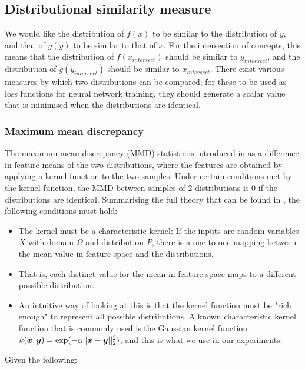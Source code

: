 \subsection{Distributional similarity measure}

We would like the distribution of $f(x)$ to be similar to the distribution of $y$, and that of $g(y)$ to be similar to that of $x$. For the intersection of concepts, this means that the distribution of $f(x_{intersect})$ should be similar to $y_{intersect}$, and the distribution of $g(y_{intersect})$ should be similar to $x_{intersect}$. There exist various measures by which two distributions can be compared; for these to be used as loss functions for neural network training, they should generate a scalar value that is minimised when the distributions are identical. 

\subsubsection{Maximum mean discrepancy}

The maximum mean discrepancy (MMD) statistic is introduced in \cite{MMDGretton} as a difference in feature means of the two distributions, where the features are obtained by applying a kernel function to the two samples. Under certain conditions met by the kernel function, the MMD between samples of 2 distributions is 0 if the distributions are identical. Summarising the full theory that can be found in \cite{MMDGretton}, the following conditions must hold:

\begin{itemize}
    \item The kernel must be a characteristic kernel: If the inputs are random variables $X$ with domain $\Omega$ and distribution $P$, there is a one to one mapping between the mean value in feature space and the distributions. \cite{KernelMeanEmbeddingReview} 
    \item That is, each distinct value for the mean in feature space maps to a different possible distribution. 
    \item An intuitive way of looking at this is that the kernel function must be "rich enough" to represent all possible distributions. A known characteristic kernel function that is commonly used is the Gaussian kernel function $k(\boldsymbol{x}, \boldsymbol{y}) = \exp(-\alpha ||\boldsymbol{x} - \boldsymbol{y}||_2^2)$, and this is what we use in our experiments. 
\end{itemize}

Given the following:

